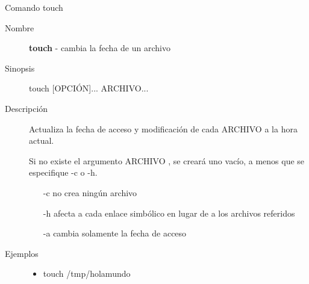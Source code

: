 \begin{frame}[c]{Comando touch}
  \begin{description}
    \item[Nombre]
      \textbf{touch} - cambia la fecha de un archivo

    \vspace{\baselineskip}
    \item[Sinopsis]
      touch [OPCIÓN]... ARCHIVO...
      
    \vspace{\baselineskip}
    \item[Descripción]
      Actualiza la fecha de acceso y modificación de cada ARCHIVO a la hora
      actual.

      Si no existe el argumento ARCHIVO , se creará uno vacío, a menos que
      se especifique -c o -h.

      \begin{itemize}
        \item [-c] no crea ningún archivo
        \item [-h] afecta a cada enlace simbólico en lugar de a los
          archivos referidos 
        \item [-a] cambia solamente la fecha de acceso
      \end{itemize}

    \vspace{\baselineskip}
    \item[Ejemplos]
      \begin{itemize}
        \item touch /tmp/holamundo
      \end{itemize}
  \end{description}
\end{frame}

